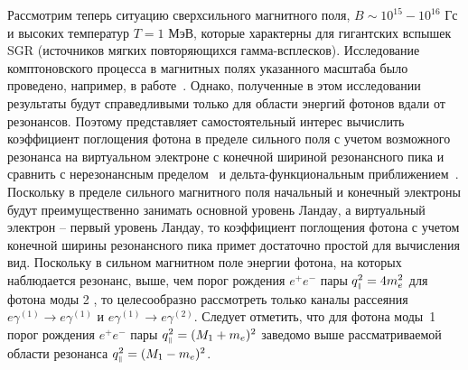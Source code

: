 
Рассмотрим теперь ситуацию сверхсильного магнитного поля, \linebreak\mbox{$B\sim 
10^{15}-10^{16}$} Гс и высоких температур $T=1$ МэВ, которые характерны для 
гигантских вспышек SGR (источников мягких повторяющихся гамма-всплесков).  
Исследование комптоновского процесса в магнитных полях указанного масштаба было 
проведено, например, в работе~\cite{Chistyakov:2009}. Однако, полученные в этом 
исследовании результаты будут справедливыми только для области энергий фотонов 
вдали от резонансов. Поэтому представляет самостоятельный интерес вычислить 
коэффициент поглощения фотона в пределе сильного поля с учетом возможного 
резонанса на виртуальном электроне с конечной шириной резонансного пика и 
сравнить с нерезонансным пределом~\cite{Chistyakov:2009} и 
дельта-функциональным приближением~\cite{Rumyantsev:2017}. Поскольку в пределе 
сильного магнитного поля начальный и конечный электроны будут преимущественно 
занимать основной уровень Ландау, а виртуальный электрон -- первый уровень 
Ландау, то коэффициент поглощения фотона с учетом конечной ширины резонансного 
пика примет достаточно простой для вычисления вид. Поскольку в сильном 
магнитном поле энергии фотона, на которых наблюдается резонанс, 
выше, чем порог рождения $e^+e^-$ пары $q_{\mbox{\tiny $\|$}}^2=4m_e^2$ для фотона моды 2 , 
то целесообразно рассмотреть только каналы рассеяния $e\gamma^{(1)}\to 
e\gamma^{(1)}$ и $e\gamma^{(1)}\to e\gamma^{(2)}$. Следует отметить, что для 
фотона моды~1 порог рождения $e^+e^-$ пары $q_{\mbox{\tiny $\|$}}^2=(M_1+m_e)^2$ заведомо 
выше рассматриваемой области резонанса $q_{\mbox{\tiny $\|$}}^2=(M_1-m_e)^2$.

